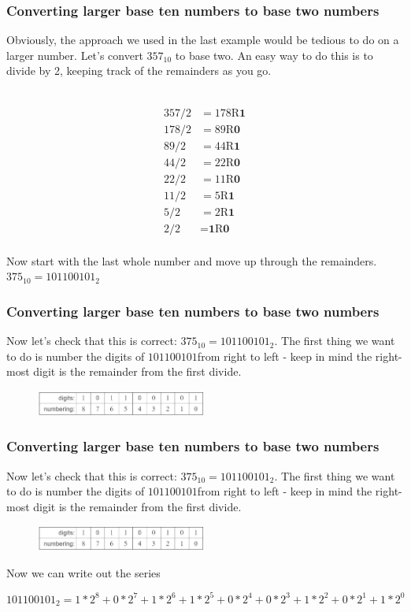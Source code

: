\documentclass{if-beamer}
\begin{document}
\begin{frame}
\frametitle{Converting larger base ten numbers to base two numbers}

Obviously, the approach we used in the last example would be tedious to do on a larger number. Let's convert $357_{10}$ to base two. An easy way to do this is to divide by 2, keeping track of the remainders as you go. \\~\

\centering
\begin{align*}
357/2 &= 178 \textrm{R}\textbf{1} \\
178/2 &= 89 \textrm{R}\textbf{0}\\
89/2 &= 44 \textrm{R}\textbf{1}\\
44/2 &= 22 \textrm{R}\textbf{0}\\
22/2 &= 11 \textrm{R}\textbf{0}\\
11/2 &= 5 \textrm{R}\textbf{1}\\
5/2 &= 2 \textrm{R}\textbf{1}\\
2/2 &= \textbf{1}\textrm{R}\textbf{0} \\
\end{align*}

Now start with the last whole number and move up through the remainders. 
\centering
$375_{10} = 101100101_2$
\end{frame}

\begin{frame}
\frametitle{Converting larger base ten numbers to base two numbers}
Now let's check that this is correct: 
$375_{10} = 101100101_2$.
The first thing we want to do is number the digits of $101100101$from right to left - keep in mind the right-most digit is the remainder from the first divide.
\begin{figure}
	\centering
	\includegraphics[width = 0.5\textwidth]{figures/digits.jpg}
\end{figure}
\end{frame}

\begin{frame}
\frametitle{Converting larger base ten numbers to base two numbers}
Now let's check that this is correct: 
$375_{10} = 101100101_2$.
The first thing we want to do is number the digits of $101100101$from right to left - keep in mind the right-most digit is the remainder from the first divide.
\begin{figure}
	\centering
	\includegraphics[width = 0.5\textwidth]{figures/digits.jpg}
\end{figure}
Now we can write out the series

$$101100101_2 = 1*2^8 + 0*2^7 + 1*2^6 + 1*2^5 + 0*2^4 + 0*2^3 + 1*2^2 + 0*2^1 + 1*2^0$$
\end{frame}
\end{document}
